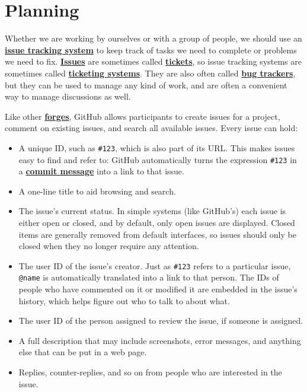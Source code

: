 \documentclass[
]{krantz}
\newcommand{\gref}[2]{\hyperlink{#2}{\textbf{#1}}}
\begin{document}
\hypertarget{teams-planning}{%
\section{Planning}\label{teams-planning}}

Whether we are working by ourselves or with a group of people,
we should use an \gref{issue tracking system}{issue\_tracking\_system}
to keep track of tasks we need to complete or problems we need to fix.
\gref{Issues}{issue} are sometimes called \gref{tickets}{ticket},
so issue tracking systems are sometimes called \gref{ticketing systems}{ticketing\_system}.
They are also often called \gref{bug trackers}{bug\_tracker},
but they can be used to manage any kind of work,
and are often a convenient way to manage discussions as well.

Like other \gref{forges}{forge},
GitHub allows participants to create issues for a project,
comment on existing issues,
and search all available issues.
Every issue can hold:

\begin{itemize}
\item
  A unique ID, such as \texttt{\#123}, which is also part of its URL.
  This makes issues easy to find and refer to:
  GitHub automatically turns the expression \texttt{\#123} in a \gref{commit message}{commit\_message}
  into a link to that issue.
\item
  A one-line title to aid browsing and search.
\item
  The issue's current status.
  In simple systems (like GitHub's) each issue is either open or closed,
  and by default,
  only open issues are displayed.
  Closed items are generally removed from default interfaces,
  so issues should only be closed when they no longer require any attention.
\item
  The user ID of the issue's creator.
  Just as \texttt{\#123} refers to a particular issue,
  \texttt{@name} is automatically translated into a link to that person.
  The IDs of people who have commented on it or modified it are embedded in the issue's history,
  which helps figure out who to talk to about what.
\item
  The user ID of the person assigned to review the issue, if someone is assigned.
\item
  A full description that may include screenshots,
  error messages,
  and anything else that can be put in a web page.
\item
  Replies, counter-replies, and so on from people who are interested in the issue.
\end{itemize}
\end{document}
